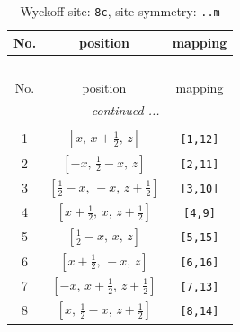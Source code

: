 \documentclass[fleqn,8pt]{jsarticle}
\begin{document}
\renewcommand{\arraystretch}{1.2}
\begin{longtable}{ccc}
\caption{Wyckoff site: {\tt 8c}, site symmetry: {\tt ..m}}
 \\
 \hline \hline
No. & position & mapping \\ \hline \endfirsthead

\multicolumn{2}{l}{\tablename\ \thetable{}} \\
 \hline \hline
No. & position & mapping \\ \hline \endhead

 \hline \hline
\multicolumn{2}{r}{\footnotesize\it continued ...} \\ \endfoot

 \hline \hline
\multicolumn{2}{r}{} \\ \endlastfoot

1 & $\left[ x,\, x + \frac{1}{2},\, z \right]$ & {\tt [1,12]} \\ \hline
2 & $\left[ - x,\, \frac{1}{2} - x,\, z \right]$ & {\tt [2,11]} \\ \hline
3 & $\left[ \frac{1}{2} - x,\, - x,\, z + \frac{1}{2} \right]$ & {\tt [3,10]} \\ \hline
4 & $\left[ x + \frac{1}{2},\, x,\, z + \frac{1}{2} \right]$ & {\tt [4,9]} \\ \hline
5 & $\left[ \frac{1}{2} - x,\, x,\, z \right]$ & {\tt [5,15]} \\ \hline
6 & $\left[ x + \frac{1}{2},\, - x,\, z \right]$ & {\tt [6,16]} \\ \hline
7 & $\left[ - x,\, x + \frac{1}{2},\, z + \frac{1}{2} \right]$ & {\tt [7,13]} \\ \hline
8 & $\left[ x,\, \frac{1}{2} - x,\, z + \frac{1}{2} \right]$ & {\tt [8,14]} \\
\end{longtable}
\renewcommand{\arraystretch}{1.2}
\end{document}
